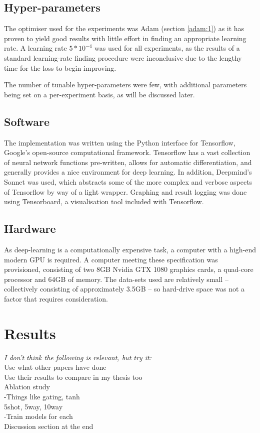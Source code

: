 \documentclass{report}
\begin{document}
\section{Hyper-parameters}
The optimiser used for the experiments was Adam (section \ref{adam:1}) as it has proven to yield good results with little effort in finding an appropriate learning rate. A learning rate $5*10^{-4}$ was used for all experiments, as the results of a standard learning-rate finding procedure were inconclusive due to the lengthy time for the loss to begin improving. \par
The number of tunable hyper-parameters were few, with additional parameters being set on a per-experiment basis, as will be discussed later. \par

\section{Software}
The implementation was written using the Python interface for Tensorflow\parencite{tensorflow}, Google's open-source computational framework. Tensorflow has a vast collection of neural network functions pre-written, allows for automatic differentiation, and generally provides a nice environment for deep learning. In addition, Deepmind's Sonnet\parencite{sonnet} was used, which abstracts some of the more complex and verbose aspects of Tensorflow by way of a light wrapper. Graphing and result logging was done using Tensorboard, a visualisation tool included with Tensorflow. \par

\section{Hardware}
As deep-learning is a computationally expensive task, a computer with a high-end modern GPU is required. A computer meeting these specification was provisioned, consisting of two 8GB Nvidia GTX 1080 graphics cards, a quad-core processor and 64GB of memory. The data-sets used are relatively small -- collectively consisting of approximately 3.5GB -- so hard-drive space was not a factor that requires consideration.  \par


\chapter{Results}
\textit{I don't think the following is relevant, but try it:} \\
Use what other papers have done \\
Use their results to compare in my thesis too \\
Ablation study \\
-Things like gating, tanh \\
5shot,  5way, 10way \\
-Train models for each \\
Discussion section at the end \\
\end{document}
